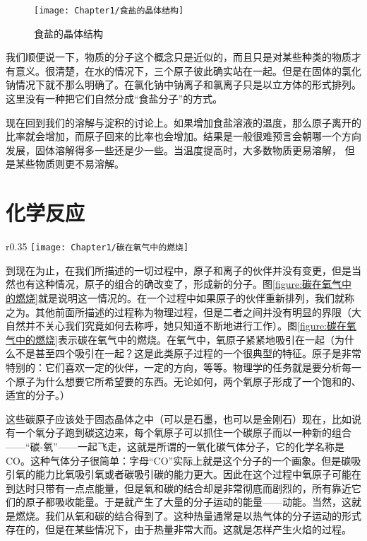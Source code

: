 \begin{figure}
    \centering
    \texttt{[image: Chapter1/食盐的晶体结构]}
    \caption{食盐的晶体结构}
    \label{figure:食盐的晶体结构}
\end{figure}

我们顺便说一下，物质的分子这个概念只是近似的，而且只是对某些种类的物质才有意义。很清楚，在水的情况下，三个原子彼此确实站在一起。但是在固体的氯化钠情况下就不那么明确了。在氯化钠中钠离子和氯离子只是以立方体的形式排列。这里没有一种把它们自然分成“食盐分子”的方式。

现在回到我们的溶解与淀积的讨论上。如果增加食盐溶液的温度，那么原子离开的比率就会增加，而原子回来的比率也会增加。结果是一般很难预言会朝哪一个方向发展，固体溶解得多一些还是少一些。当温度提高时，大多数物质更易溶解， 但是某些物质则更不易溶解。

\section{化学反应}

\begin{wrapfigure}{r}{0.35\textwidth}
    \centering
    \texttt{[image: Chapter1/碳在氧气中的燃烧]}
    \caption{碳在氧气中的燃烧}
    \label{figure:碳在氧气中的燃烧}
\end{wrapfigure}
到现在为止，在我们所描述的一切过程中，原子和离子的伙伴并没有变更，但是当然也有这种情况，原子的组合的确改变了，形成新的分子。图\ref{figure:碳在氧气中的燃烧}就是说明这一情况的。在一个过程中如果原子的伙伴重新排列，我们就称之为。其他前面所描述的过程称为物理过程，但是二者之间并没有明显的界限（大自然并不关心我们究竟如何去称呼，她只知道不断地进行工作）。图\ref{figure:碳在氧气中的燃烧}表示碳在氧气中的燃烧。在氧气中，氧原子紧紧地吸引在一起（为什么不是甚至四个吸引在一起？这是此类原子过程的一个很典型的特征。原子是非常特别的：它们喜欢一定的伙伴，一定的方向，等等。物理学的任务就是要分析每一个原子为什么想要它所希望要的东西。无论如何，两个氧原子形成了一个饱和的、适宜的分子。）

这些碳原子应该处于固态晶体之中（可以是石墨，也可以是金刚石）现在，比如说有一个氧分子跑到碳这边来，每个氧原子可以抓住一个碳原子而以一种新的组合——“碳-氧”——一起飞走，这就是所谓的一氧化碳气体分子，它的化学名称是CO。这种气体分子很简单：字母“CO”实际上就是这个分子的一个画象。但是碳吸引氧的能力比氧吸引氧或者碳吸引碳的能力更大。因此在这个过程中氧原子可能在到达时只带有一点点能量，但是氧和碳的结合却是非常彻底而剧烈的，所有靠近它们的原子都吸收能量。于是就产生了大量的分子运动的能量——动能。当然，这就是燃烧。我们从氧和碳的结合得到了。这种热量通常是以热气体的分子运动的形式存在的，但是在某些情况下，由于热量非常大而。这就是怎样产生火焰的过程。

